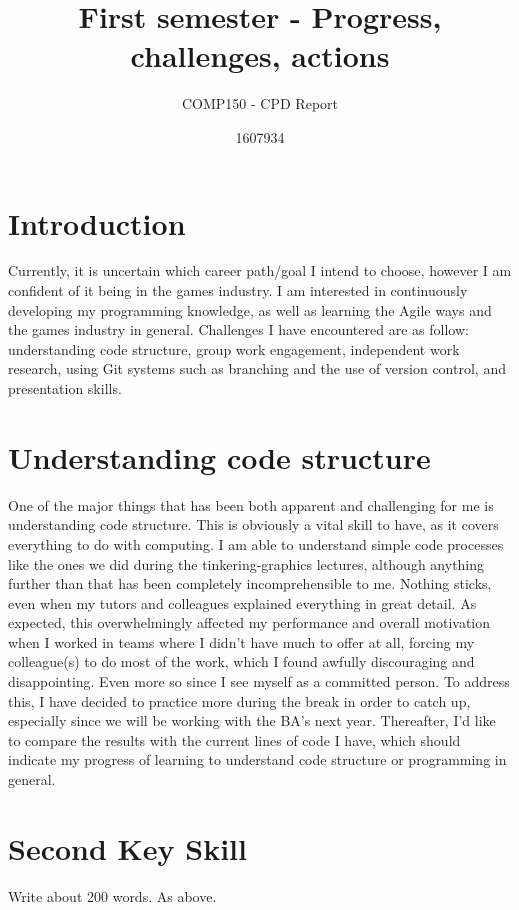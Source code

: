 \documentclass{scrartcl}
\title{First semester - Progress, challenges, actions}
\subtitle{COMP150 - CPD Report}
\author{1607934}
\begin{document}
\maketitle

\section{Introduction}

Currently, it is uncertain which career path/goal I intend to choose, however I am confident of it being in the games industry. I am interested in continuously developing my programming knowledge, as well as learning the Agile ways and the games industry in general. Challenges I have encountered are as follow: understanding code structure, group work engagement, independent work research, using Git systems such as branching and the use of version control, and presentation skills. 

\section{Understanding code structure}
One of the major things that has been both apparent and challenging for me is understanding code structure. This is obviously a vital skill to have, as it covers everything to do with computing. I am able to understand simple code processes like the ones we did during the tinkering-graphics lectures, although anything further than that has been completely incomprehensible to me. Nothing sticks, even when my tutors and colleagues explained everything in great detail. As expected, this overwhelmingly affected my performance and overall motivation when I worked in teams where I didn't have much to offer at all, forcing my colleague(s) to do most of the work, which I found awfully discouraging and disappointing. Even more so since I see myself as a committed person. To address this, I have decided to practice more during the break in order to catch up, especially since we will be working with the BA's next year. Thereafter, I'd like to compare the results with the current lines of code I have, which should indicate my progress of learning to understand code structure or programming in general.  

\section{Second Key Skill}

Write about 200 words. As above.
\end{document}
